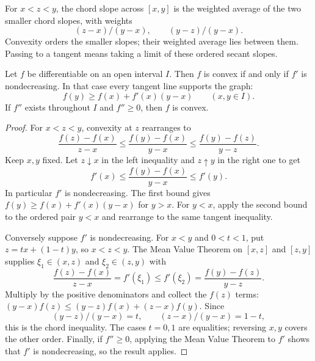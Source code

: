 \begin{center}
\end{center}
For $x<z<y$, the chord slope across $[x,y]$ is the weighted average
of the two smaller chord slopes, with weights
\[
(z-x)/(y-x),\qquad (y-z)/(y-x).
\]
 Convexity orders the smaller slopes; their weighted
average lies between them. Passing to a tangent means taking a limit
of these ordered secant slopes.
\begin{theorem}
\label{thm:convex-derivative-criteria}
Let $f$ be differentiable on an open interval $I$.  Then $f$ is convex if
and only if $f'$ is nondecreasing.  In that case every tangent line supports
the graph:
\[
f(y)\geq f(x)+f'(x)(y-x)
\qquad(x,y\in I).
\]
If $f''$ exists throughout $I$ and $f''\geq0$, then $f$ is convex.
\end{theorem}
\begin{proof}
For $x<z<y$, convexity at $z$ rearranges to
\[
\frac{f(z)-f(x)}{z-x}\leq\frac{f(y)-f(x)}{y-x}
\leq\frac{f(y)-f(z)}{y-z}.
\]
Keep $x,y$ fixed. Let $z\downarrow x$ in the left inequality and
$z\uparrow y$ in the right one to get
\[
f'(x)\leq\frac{f(y)-f(x)}{y-x}\leq f'(y).
\]
In particular $f'$ is nondecreasing. The first bound gives
$f(y)\geq f(x)+f'(x)(y-x)$ for $y>x$. For $y<x$, apply the second
bound to the ordered pair $y<x$ and rearrange to the same tangent inequality.

Conversely suppose $f'$ is nondecreasing. For $x<y$ and $0<t<1$, put
$z=tx+(1-t)y$, so $x<z<y$. The Mean Value Theorem on $[x,z]$ and
$[z,y]$ supplies $\xi_1\in(x,z)$ and $\xi_2\in(z,y)$ with
\[
\frac{f(z)-f(x)}{z-x}=f'(\xi_1)\leq f'(\xi_2)
=\frac{f(y)-f(z)}{y-z}.
\]
Multiply by the positive denominators and collect the $f(z)$ terms:
$(y-x)f(z)\leq(y-z)f(x)+(z-x)f(y)$.
Since
\[
(y-z)/(y-x)=t,\qquad (z-x)/(y-x)=1-t,
\]
 this is the chord inequality.
The cases $t=0,1$ are equalities; reversing $x,y$ covers the other order.
Finally, if $f''\geq0$, applying the Mean Value Theorem to $f'$ shows
that $f'$ is nondecreasing, so the result applies.
\end{proof}

